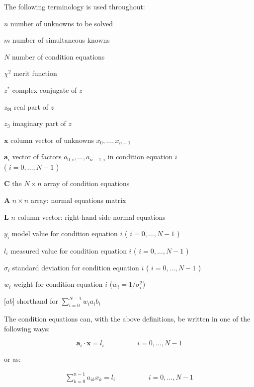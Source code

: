 The following terminology is used throughout:
\begin{list}{1}{\setlength{\labelwidth}{6em}}
\item[$n$] number of unknowns to be solved \Mn
\item[$m$] number of simultaneous knowns \Mn
\item[$N$] number of condition equations \Mn
\item[$\chi^2$] merit function \Mn
\item[$z^*$] complex conjugate of $z$  \Mn
\item[$z_{\Re}$] real part of $z$ \Mn
\item[$z_{\Im}$] imaginary part of $z$ \Mn
\item[$\mathbf{x}$] column vector of unknowns $x_{0},\ldots,x_{n-1}$ \Mn
\item[$\mathbf{a}_{i}$] vector of factors $a_{0,i},\ldots,a_{n-1,i}$ in
condition equation $i$ \\( $i=0,\ldots,N-1$ ) \Mn
\item[$\mathbf{C}$] the $N\times n$ array of condition equations \Mn
\item[$\mathbf{A}$] $n\times n$ array: normal equations matrix \Mn
\item[$\mathbf{L}$] $n$ column vector: right-hand side normal equations  \Mn
\item[$y_{i}$] model value for condition equation $i$ (
$i=0,\ldots,N-1$ ) \Mn
\item[$l_{i}$] measured value for condition equation $i$ (
$i=0,\ldots,N-1$ ) \Mn
\item[$\sigma_{i}$] standard deviation for condition equation $i$ (
$i=0,\ldots,N-1$ ) \Mn
\item[$w_{i}$] weight for condition equation $i$ ($w_{i}=1/\sigma_{i}^2$) \Mn
\item[${[}ab{]}$] shorthand for $\sum_{i=0}^{N-1} w_{i} a_{i} b_{i}$ \Mn
\end{list}

The condition equations can, with the above definitions, be written in one of
the following ways:

\begin{equation}
	\mathbf{a}_{i}\cdot\mathbf{x}  =  l_{i} \hspace{2cm} i=0,\ldots,N-1
\end{equation}

or as:

\begin{eqnarray}
	\sum_{k=0}^{n-1} a_{ik}x_{k}  =  l_{i} \hspace{2cm} i=0,\ldots,N-1
\end{eqnarray}


